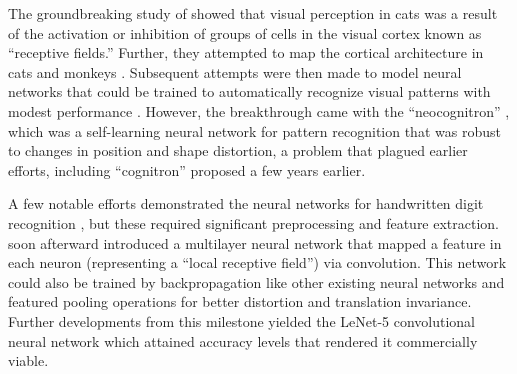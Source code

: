 \documentclass[Journal,letterpaper, SingleSpace, InsideFigs]{ascelike-new}
\begin{document}
The groundbreaking study of  showed that visual perception in cats was a result of the
activation or inhibition of groups of cells in the visual cortex known as ``receptive fields.''  Further, they attempted
to map the cortical architecture in cats and monkeys \cite{hubel1962receptive,hubel1965receptive,hubel1968receptive}.
Subsequent attempts were then made to model neural networks that could be trained to automatically recognize visual patterns with modest performance \cite{rosenblatt1962principles,kabrisky1966proposed,giebel1971feature,fukushima1975cognitron}. However, the breakthrough came with the ``neocognitron'' \cite{fukushima1980neocognitron}, which
was a self-learning neural network for pattern recognition that was robust to changes in position and shape distortion, a problem that plagued earlier efforts, including ``cognitron'' \cite{fukushima1975cognitron} proposed a few years earlier.

A few notable efforts demonstrated the neural networks for handwritten digit recognition
\cite{fukushima1988neocognitron,denker1988neural}, but these required significant preprocessing and feature
extraction. \cite{lecun1989handwritten} soon afterward introduced a multilayer neural network that mapped a feature in each neuron (representing a ``local receptive field'') via convolution. This network could also be trained by backpropagation like other existing neural networks and featured pooling operations for better distortion and
translation invariance. Further developments from this milestone yielded the LeNet-5 convolutional neural network which attained accuracy levels that rendered it commercially viable.
\end{document}
